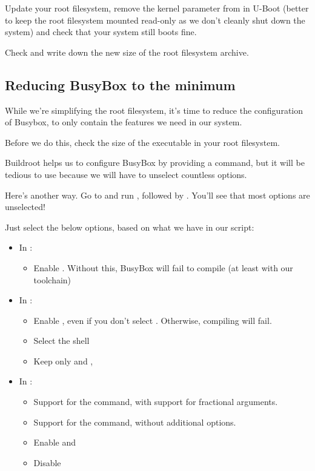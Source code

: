 Update your root filesystem, remove the  kernel parameter from
 in U-Boot (better to keep the root filesystem mounted read-only as we don't
cleanly shut down the system) and check that your system still boots fine.

Check and write down the new size of the root filesystem archive.

\subsection{Reducing BusyBox to the minimum}

While we're simplifying the root filesystem, it's time to reduce the
configuration of Busybox, to only contain the features we need in our
system.

Before we do this, check the size of the  executable in
your root filesystem.

Buildroot helps us to configure BusyBox by providing a  command, but it will be tedious to use because we
will have to unselect countless options.

Here's another way. Go to  and run
, followed by . You'll see
that most options are unselected!

Just select the below options, based on what we have in our
 script:
\begin{itemize}
  \item In :
  \begin{itemize}
     \item Enable . Without this, BusyBox
           will fail to compile (at least with our toolchain)
  \end{itemize}
  \item In :
  \begin{itemize}
     \item Enable , even
	   if you don't select . Otherwise, compiling
            will fail.
     \item Select the  shell
     \item Keep only  and
           ,
  \end{itemize}
  \item In :
  \begin{itemize}
     \item Support for the  command, with support for fractional arguments.
     \item Support for the  command, without additional options.
     \item Enable  and \code{test as [}
     \item Disable 
  \end{itemize}
\end{itemize}

